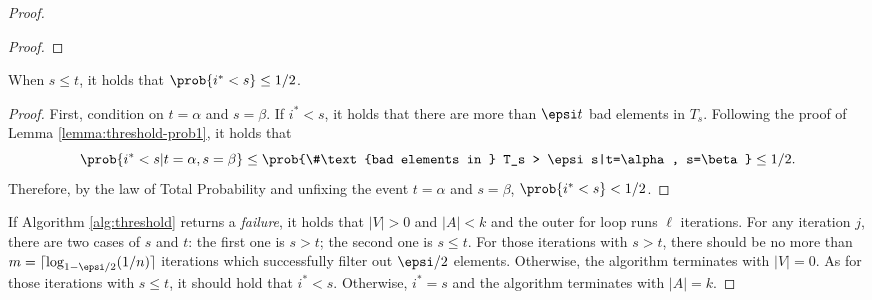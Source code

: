 \begin{proof}
\begin{proof}
\end{proof}
\begin{lemma} \label{lemma:threshold-prob2}
	When $s \le t$, it holds that $\prob{i^* < s} \le 1/2$.
\end{lemma}
\begin{proof}
	First, condition on $t=\alpha$ and $s=\beta$.
	If $i^* < s$, it holds that there are more than $\epsi t$
	bad elements in $T_s$.
	Following the proof of Lemma \ref{lemma:threshold-prob1},
	it holds that 
	$$\prob{i^* < s|t=\alpha, s=\beta} \le \prob{\#\text{bad elements in } T_s > \epsi s|t=\alpha, s=\beta} \le 1/2.$$
	Therefore, by the law of Total Probability and unfixing the event $t=\alpha$ and $s=\beta$,
	$\prob{i^* <s} < 1/2$.
\end{proof}
If Algorithm \ref{alg:threshold} returns a \textit{failure}, 
it holds that $|V| > 0$ and $|A| < k$ 
and the outer for loop runs $\ell$ iterations.
For any iteration $j$, there are two cases of $s$ and $t$:
the first one is $s>t$; the second one is $s \le t$.
For those iterations with $s>t$,
there should be no more than $m=\lceil\log_{1-\epsi/2}(1/n) \rceil$ iterations 
which successfully filter out $\epsi/2$ elements.
Otherwise, the algorithm terminates with $|V|=0$.
As for those iterations with $s \le t$,
it should hold that $i^* < s$.
Otherwise, $i^*=s$ and the algorithm terminates with $|A|=k$.


\end{proof}
